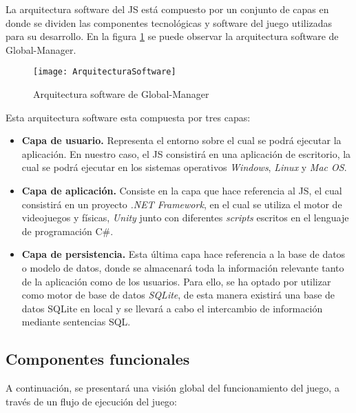 La arquitectura software del JS está compuesto por un conjunto de capas en donde se dividen las componentes tecnológicas y software del juego utilizadas para su desarrollo. En la figura \ref{fig:ArquitecturaSoftware} se puede observar la arquitectura software de Global-Manager.

\begin{figure}[htb]
	\centering
	\texttt{[image: ArquitecturaSoftware]}
	\caption[Arquitectura software de Global-Manager]{Arquitectura software de Global-Manager}
	\label{fig:ArquitecturaSoftware}
\end{figure}

Esta arquitectura software esta compuesta por tres capas:

\begin{itemize}
	\item \textbf{Capa de usuario.} Representa el entorno sobre el cual se podrá ejecutar la aplicación. En nuestro caso, el JS consistirá en una aplicación de escritorio, la cual se podrá ejecutar en los sistemas operativos \emph{Windows}, \emph{Linux} y \emph{Mac OS}.
	\item \textbf{Capa de aplicación.} Consiste en la capa que hace referencia al JS, el cual consistirá en un proyecto \emph{.NET Framework}, en el cual se utiliza el motor de videojuegos y físicas, \emph{Unity} junto con diferentes \emph{scripts} escritos en el lenguaje de programación C\#.  
	\item \textbf{Capa de persistencia.} Esta última capa hace referencia a la base de datos o modelo de datos, donde se almacenará toda la información relevante tanto de la aplicación como de los usuarios. Para ello, se ha optado por utilizar como motor de base de datos \emph{SQLite}, de esta manera existirá una base de datos SQLite en local y se llevará a cabo el intercambio de información mediante sentencias SQL.
\end{itemize}

\subsection{Componentes funcionales}
\label{sec:ComponentesFuncionales}

A continuación, se presentará una visión global del funcionamiento del juego, a través de un flujo de ejecución del juego:

